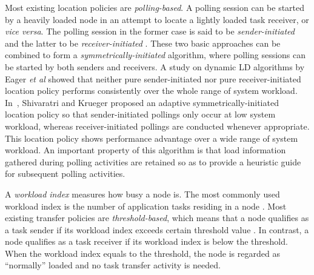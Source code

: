 %
Most existing location policies are {\it polling-based\/}.
A polling session can be started by a heavily loaded node in
an attempt to locate a lightly loaded task receiver, or {\it vice versa\/}.
The polling session in the former case is said to be
{\it sender-initiated\/} and the
latter to be {\it receiver-initiated\/} \cite{eager86b,wang85}.
These two basic approaches can be combined to form a
{\it symmetri\-cally-initiated\/} algorithm,
where polling sessions can be started by both senders and receivers.
%
A study on dynamic LD algorithms by Eager {\it et al\/} \cite{eager86b}
showed that neither pure sender-initiated
nor pure receiver-initiated location policy performs
consistently over the whole range of system workload.
%
In~\cite{shiv90}, Shivaratri and Krueger
proposed an adaptive symmetri\-cally-initiated location policy
so that sender-initiated pollings only occur
at low system workload, whereas receiver-initiated pollings are
conducted whenever appropriate.
This location policy shows performance advantage over a wide range
of system workload.
An important property of this algorithm is that load information
gathered during polling activities are retained so as to provide
a heuristic guide for subsequent polling activities.


%
A {\it workload index\/} measures how busy a node is.
The most commonly used workload index is
the number of application tasks residing in a node \cite{hatch90,kremien92}.
Most existing transfer policies are {\it threshold-based\/},
which means that a node qualifies as a task sender if its workload index
exceeds certain threshold value
\cite{eager86a,lu94,mirchandaney90,shiv90,stankovic84}.
In contrast, a node qualifies as a task receiver if
its workload index is below the threshold.
When the workload index equals to the threshold,
the node is regarded as ``normally'' loaded and no task transfer activity
is needed.


\chapterend
